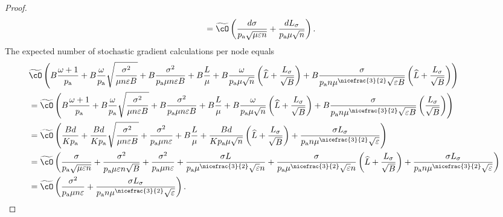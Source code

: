 \documentclass{article}
\newcommand*{\probavailable}{\ensuremath{p_{\textnormal{a}}}}
\begin{document}
\begin{proof}
\begin{align*}
      &= \widetilde{\cO}\left(\frac{d \sigma}{\probavailable \sqrt{\mu \varepsilon n}} + \frac{d L_{\sigma}}{\probavailable \mu \sqrt{n}}\right).
    \end{align*}
    The expected number of stochastic gradient calculations per node equals
    \begin{align*}
      &\widetilde{\cO}\left(B\frac{\omega + 1}{\probavailable} + B\frac{\omega}{\probavailable}\sqrt{\frac{\sigma^2}{\mu n \varepsilon B}} + B\frac{\sigma^2}{\probavailable \mu n \varepsilon B} + B\frac{L}{\mu} + B\frac{\omega}{\probavailable \mu \sqrt{n}} \left(\widehat{L} + \frac{L_{\sigma}}{\sqrt{B}}\right) + B\frac{\sigma}{\probavailable n \mu^{\nicefrac{3}{2}} \sqrt{\varepsilon B}}\left(\widehat{L} + \frac{L_{\sigma}}{\sqrt{B}}\right)\right) \\
      &=\widetilde{\cO}\left(B\frac{\omega + 1}{\probavailable} + B\frac{\omega}{\probavailable}\sqrt{\frac{\sigma^2}{\mu n \varepsilon B}} + B\frac{\sigma^2}{\probavailable \mu n \varepsilon B} + B\frac{L}{\mu} + B\frac{\omega}{\probavailable \mu \sqrt{n}} \left(\widehat{L} + \frac{L_{\sigma}}{\sqrt{B}}\right) + B\frac{\sigma}{\probavailable n \mu^{\nicefrac{3}{2}} \sqrt{\varepsilon B}}\left(\frac{L_{\sigma}}{\sqrt{B}}\right)\right) \\
      &=\widetilde{\cO}\left(\frac{Bd}{K\probavailable} + \frac{B d}{K \probavailable}\sqrt{\frac{\sigma^2}{\mu n \varepsilon B}} + \frac{\sigma^2}{\probavailable \mu n \varepsilon} + B\frac{L}{\mu} + \frac{B d}{K \probavailable \mu \sqrt{n}} \left(\widehat{L} + \frac{L_{\sigma}}{\sqrt{B}}\right) + \frac{\sigma L_{\sigma}}{\probavailable n \mu^{\nicefrac{3}{2}} \sqrt{\varepsilon}}\right) \\
      &=\widetilde{\cO}\left(\frac{\sigma}{\probavailable \sqrt{\mu \varepsilon n}} + \frac{\sigma^2}{\probavailable \mu \varepsilon n \sqrt{B}} + \frac{\sigma^2}{\probavailable \mu n \varepsilon} + \frac{\sigma L}{\probavailable \mu^{\nicefrac{3}{2}}\sqrt{\varepsilon} n} + \frac{\sigma}{\probavailable \mu^{\nicefrac{3}{2}} \sqrt{\varepsilon} n} \left(\widehat{L} + \frac{L_{\sigma}}{\sqrt{B}}\right) + \frac{\sigma L_{\sigma}}{\probavailable n \mu^{\nicefrac{3}{2}} \sqrt{\varepsilon}}\right) \\
      &=\widetilde{\cO}\left(\frac{\sigma^2}{\probavailable \mu n \varepsilon} + \frac{\sigma L_{\sigma}}{\probavailable n \mu^{\nicefrac{3}{2}} \sqrt{\varepsilon}}\right).
    \end{align*}
    \end{proof}
\end{document}
